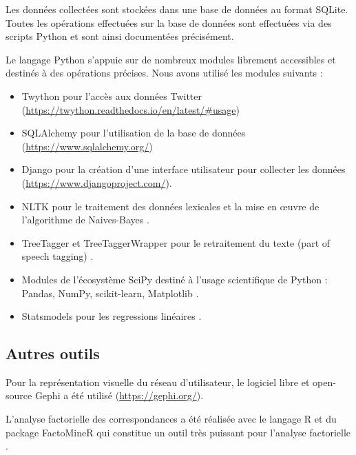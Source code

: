 Les données collectées sont stockées dans une base de données au format SQLite. Toutes les opérations effectuées sur la base de données sont effectuées via des scripts Python et sont ainsi documentées précisément.

Le langage Python s’appuie sur de nombreux modules librement accessibles et destinés à des opérations précises. Nous avons utilisé les modules suivants :
\begin{itemize}
    \item Twython pour l’accès aux données Twitter (\url{https://twython.readthedocs.io/en/latest/#usage})
    \item SQLAlchemy pour l’utilisation de la base de données (\url{https://www.sqlalchemy.org/})
    \item Django pour la création d’une interface utilisateur pour collecter les données (\url{https://www.djangoproject.com/}).
    \item NLTK pour le traitement des données lexicales et la mise en œuvre de l’algorithme de Naives-Bayes \parencite{bird2009natural}.
    \item TreeTagger et TreeTaggerWrapper pour le retraitement du texte (part of speech tagging) \parencite{schmid1994probabilistic, schmid1995improvements}.
    \item Modules de l’écosystème SciPy destiné à l’usage scientifique de Python : Pandas, NumPy, scikit-learn, Matplotlib \parencite{hunter2007matplotlib:, jones2001scipy:, mckinney2010data, oliphant2007python, pedregosa2011scikit-learn:}.
    \item Statsmodels pour les regressions linéaires \parencite{seabold2010statsmodels:}.
\end{itemize}


\subsection{Autres outils}

Pour la représentation visuelle du réseau d’utilisateur, le logiciel libre et open-source Gephi a été utilisé (\url{https://gephi.org/}).

L’analyse factorielle des correspondances a été réalisée avec le langage R et du package FactoMineR qui constitue un outil très puissant pour l’analyse factorielle \parencite{le2008factominer} .
